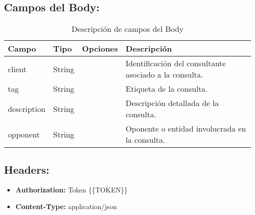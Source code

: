\subsection*{Campos del Body:}

\begin{table}[H]
    \centering
    \begin{tabular}{|l|l|l|p{7cm}|}
        \hline
        \textbf{Campo} & \textbf{Tipo} & \textbf{Opciones} & \textbf{Descripción} \\ \hline
        client & String & & Identificación del consultante asociado a la consulta. \\ \hline
        tag & String & & Etiqueta de la consulta. \\ \hline
        description & String & & Descripción detallada de la consulta. \\ \hline
        opponent & String & & Oponente o entidad involucrada en la consulta. \\ \hline
    \end{tabular}
    \caption{Descripción de campos del Body}
    \label{tab:body-fields-consultation}
\end{table}

\subsection*{Headers:}

\begin{itemize}
    \item \textbf{Authorization:} Token \{\{TOKEN\}\}
    \item \textbf{Content-Type:} application/json
\end{itemize}
